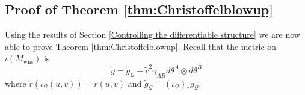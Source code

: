 \documentclass{article}
\newcommand{\Q}{\mathcal{Q}}
\newcommand{\Mw}{M_{\mathrm{wns}}}
\begin{document}
\subsection{Proof of Theorem \ref{thm:Christoffelblowup}}



Using the results of Section \ref{Controlling the differentiable structure} we are now able to prove Theorem \ref{thm:Christoffelblowup}. Recall that the metric on $\iota(\Mw)$ is
\begin{equation}\label{eqn:extendedmetric}
    \tilde{g}=\tilde{g}_{\Q}+\tilde{r}^2\gamma_{AB}d\theta^A\otimes d\theta^B
\end{equation} 
where $\tilde{r}(\iota_{\Q}(u,v))=r(u,v)$ and $\tilde{g}_{\Q}=(\iota_{\Q})_*g_{\Q}$.

\end{document}
